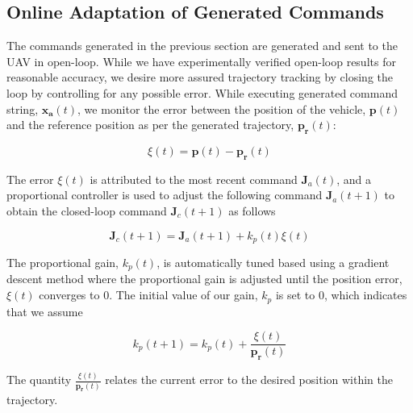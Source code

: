 \documentclass[letterpaper, 10 pt, conference]{ieeeconf}  %
\begin{document}
\subsection{Online Adaptation of Generated Commands} \label{sec:adapt}

The commands generated in the previous section are generated and sent to the UAV in open-loop. While we have experimentally verified open-loop results for reasonable accuracy, we desire more assured trajectory tracking by closing the loop by controlling for any possible error. While executing generated command string, $\mathbf{x_a}(t)$, we monitor the error between the position of the vehicle, $\mathbf{p}(t)$ and the reference position as per the generated trajectory, $\mathbf{p_r}(t)$:

\begin{equation}
    \xi(t) = \mathbf{p}(t)-\mathbf{p_r}(t)
\end{equation}

The error $\xi(t)$ is attributed to the most recent command $\mathbf{J}_a(t)$, and a proportional controller is used to adjust the following command $\mathbf{J}_a(t+1)$ to obtain the closed-loop command $\mathbf{J}_c(t+1)$ as follows

\begin{equation}
    \mathbf{J}_c(t+1) = \mathbf{J}_a(t+1) + k_p(t)\xi(t)
\end{equation}

The proportional gain, $k_p(t)$, is automatically tuned based using a gradient descent method where the proportional gain is adjusted until the position error, $\xi(t)$ converges to $0$. The initial value of our gain, $k_p$ is set to $0$, which indicates that we assume 

\begin{equation}
    k_p(t+1) = k_p(t) + \frac{\xi(t)}{\mathbf{p_r}(t)}
\end{equation}

The quantity $\frac{\xi(t)}{\mathbf{p_r}(t)}$ relates the current error to the desired position within the trajectory. 


\end{document}
